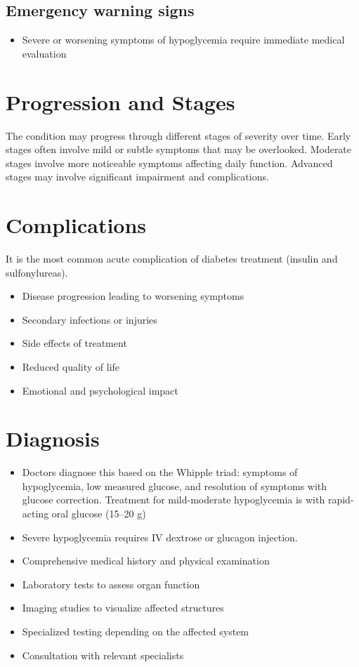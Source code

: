 \subsection{Emergency warning signs}
\begin{itemize}[noitemsep]
  \item Severe or worsening symptoms of hypoglycemia require immediate medical evaluation
\end{itemize}
\section{Progression and Stages}
The condition may progress through different stages of severity over time. Early stages often involve mild or subtle symptoms that may be overlooked. Moderate stages involve more noticeable symptoms affecting daily function. Advanced stages may involve significant impairment and complications.
\section{Complications}
It is the most common acute complication of diabetes treatment (insulin and sulfonylureas).

\begin{itemize}[noitemsep]
  \item Disease progression leading to worsening symptoms
  \item Secondary infections or injuries
  \item Side effects of treatment
  \item Reduced quality of life
  \item Emotional and psychological impact
\end{itemize}
\section{Diagnosis}
\begin{itemize}[noitemsep]
  \item Doctors diagnose this based on the Whipple triad: symptoms of hypoglycemia, low measured glucose, and resolution of symptoms with glucose correction. Treatment for mild-moderate hypoglycemia is with rapid-acting oral glucose (15--20 g)
  \item Severe hypoglycemia requires IV dextrose or glucagon injection.
  \item Comprehensive medical history and physical examination
  \item Laboratory tests to assess organ function
  \item Imaging studies to visualize affected structures
  \item Specialized testing depending on the affected system
  \item Consultation with relevant specialists
\end{itemize}
